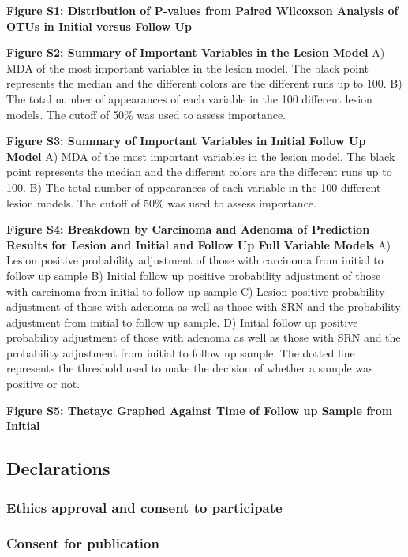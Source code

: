 \documentclass[12pt,]{article}
\begin{document}
\newpage

\textbf{Figure S1: Distribution of P-values from Paired Wilcoxson
Analysis of OTUs in Initial versus Follow Up}

\textbf{Figure S2: Summary of Important Variables in the Lesion Model}
A) MDA of the most important variables in the lesion model. The black
point represents the median and the different colors are the different
runs up to 100. B) The total number of appearances of each variable in
the 100 different lesion models. The cutoff of 50\% was used to assess
importance.

\textbf{Figure S3: Summary of Important Variables in Initial Follow Up
Model} A) MDA of the most important variables in the lesion model. The
black point represents the median and the different colors are the
different runs up to 100. B) The total number of appearances of each
variable in the 100 different lesion models. The cutoff of 50\% was used
to assess importance.

\textbf{Figure S4: Breakdown by Carcinoma and Adenoma of Prediction
Results for Lesion and Initial and Follow Up Full Variable Models} A)
Lesion positive probability adjustment of those with carcinoma from
initial to follow up sample B) Initial follow up positive probability
adjustment of those with carcinoma from initial to follow up sample C)
Lesion positive probability adjustment of those with adenoma as well as
those with SRN and the probability adjustment from initial to follow up
sample. D) Initial follow up positive probability adjustment of those
with adenoma as well as those with SRN and the probability adjustment
from initial to follow up sample. The dotted line represents the
threshold used to make the decision of whether a sample was positive or
not.

\textbf{Figure S5: Thetayc Graphed Against Time of Follow up Sample from
Initial}

\newpage

\subsection{Declarations}\label{declarations}

\subsubsection{Ethics approval and consent to
participate}\label{ethics-approval-and-consent-to-participate}

\subsubsection{Consent for publication}\label{consent-for-publication}
\end{document}
